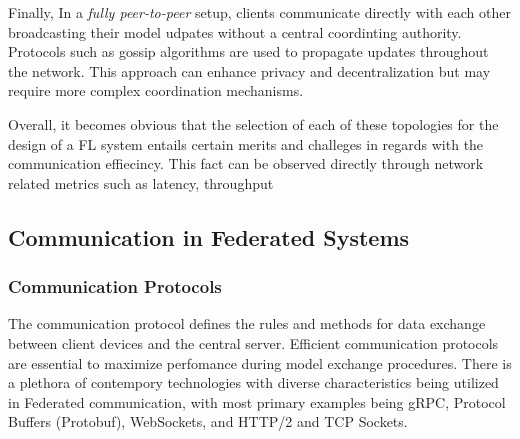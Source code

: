 Finally, In a \emph{fully peer-to-peer} setup, clients communicate directly with each other broadcasting their model udpates without a central coordinting authority.
Protocols such as gossip algorithms are used to propagate updates throughout the network. This approach can enhance privacy and decentralization but may
require more complex coordination mechanisms.

Overall, it becomes obvious that the selection of each of these topologies for the design of a FL system entails certain merits and challeges
in regards with the communication effiecincy.
This fact can be observed directly through network related metrics such as latency, throughput

\subsection{Communication in Federated Systems}
\subsubsection{Communication Protocols}
The communication protocol defines the rules and methods for data exchange between client devices and the
central server. Efficient communication protocols are essential to maximize perfomance during model exchange procedures.
There is a plethora of contempory technologies with diverse characteristics being utilized in Federated communication, with
most primary examples being gRPC, Protocol Buffers (Protobuf), WebSockets, and HTTP/2 and TCP Sockets.

